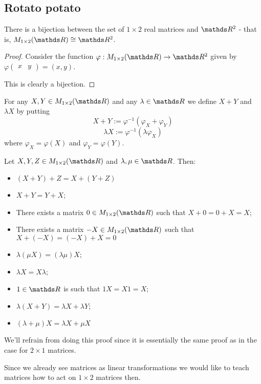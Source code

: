 \newpage
\subsection{Rotato potato}

\begin{prop}
	There is a bijection between the set of $1\times 2$ real matrices and $\R^2$ - that is, $M_{1\times 2}(\R)\iso \R^2$.
\end{prop}
\begin{proof}
	Consider the function $\varphi:M_{1\times 2}(\R)\to\R^2$ given by $\varphi\begin{pmatrix}
	x & y
	\end{pmatrix}=(x,y)$.
	
	This is clearly a bijection.
\end{proof}

\begin{df}
	For any $X,Y\in M_{1\times 2}(\R)$ and any $\lambda \in \R$ we define $X+Y$ and $\lambda X$ by putting
	\[X+Y:=\varphi^{-1}(\varphi_X+\varphi_Y)\]
	\[\lambda X:=\varphi^{-1}(\lambda\varphi_X)\]where $\varphi_X=\varphi(X)$ and $\varphi_Y=\varphi(Y)$.
\end{df}

\begin{lemma}
	Let $X,Y,Z\in M_{1\times2}(\R)$ and $\lambda,\mu\in \R$. Then:
	\begin{itemize}
		\item $(X+Y)+Z=X+(Y+Z)$
		\item $X+Y=Y+X$;
		\item There exists a matrix $0\in M_{1\times 2}(\R)$ such that $X+0=0+X=X$;
		\item There exists a matrix $-X\in M_{1\times 2}(\R)$ such that $X+(-X)=(-X)+X=0$
		\item $\lambda(\mu X)=(\lambda \mu)X$;
		\item $\lambda X=X\lambda$;
		\item $1\in \R$ is such that $1X=X1=X$;
		\item $\lambda(X+Y)=\lambda X+\lambda Y$;
		\item $(\lambda+\mu)X=\lambda X+\mu X$
	\end{itemize}
\end{lemma}

We'll refrain from doing this proof since it is essentially the same proof as in the case for $2\times 1$ matrices.

\bigskip
Since we already see matrices as linear transformations we would like to teach matrices how to act on $1\times 2$ matrices then.

